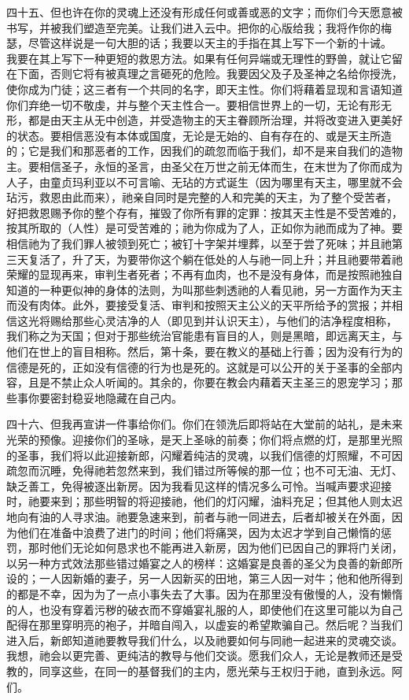 四十五、但也许在你的灵魂上还没有形成任何或善或恶的文字；而你们今天愿意被书写，并被我们塑造至完美。让我们进入云中。把你的心版给我；我将作你的梅瑟，尽管这样说是一句大胆的话；我要以天主的手指在其上写下一个新的十诫。 我要在其上写下一种更短的救恩方法。如果有任何异端或无理性的野兽，就让它留在下面，否则它将有被真理之言砸死的危险。我要因父及子及圣神之名给你授洗，使你成为门徒；这三者有一个共同的名字，即天主性。你们将藉着显现和言语知道你们弃绝一切不敬虔，并与整个天主性合一。要相信世界上的一切，无论有形无形，都是由天主从无中创造，并受造物主的天主眷顾所治理，并将改变进入更美好的状态。要相信恶没有本体或国度，无论是无始的、自有存在的、或是天主所造的；它是我们和那恶者的工作，因我们的疏忽而临于我们，却不是来自我们的造物主。要相信圣子，永恒的圣言，由圣父在万世之前无体而生，在末世为了你而成为人子，由童贞玛利亚以不可言喻、无玷的方式诞生（因为哪里有天主，哪里就不会玷污，救恩由此而来），祂亲自同时是完整的人和完美的天主，为了整个受苦者，好把救恩赐予你的整个存有，摧毁了你所有罪的定罪：按其天主性是不受苦难的，按其所取的（人性）是可受苦难的；祂为你成为了人，正如你为祂而成为了神。要相信祂为了我们罪人被领到死亡；被钉十字架并埋葬，以至于尝了死味；并且祂第三天复活了，升了天，为要带你这个躺在低处的人与祂一同上升；并且祂要带着祂荣耀的显现再来，审判生者死者；不再有血肉，也不是没有身体，而是按照祂独自知道的一种更似神的身体的法则，为叫那些刺透祂的人看见祂，另一方面作为天主而没有肉体。此外，要接受复活、审判和按照天主公义的天平所给予的赏报；并相信这光将赐给那些心灵洁净的人（即见到并认识天主），与他们的洁净程度相称，我们称之为天国；但对于那些统治官能患有盲目的人，则是黑暗，即远离天主，与他们在世上的盲目相称。然后，第十条，要在教义的基础上行善；因为没有行为的信德是死的，正如没有信德的行为也是死的。这就是可以公开的关于圣事的全部内容，且是不禁止众人听闻的。其余的，你要在教会内藉着天主圣三的恩宠学习；那些事你要密封稳妥地隐藏在自己内。\par

四十六、但我再宣讲一件事给你们。你们在领洗后即将站在大堂前的站礼，是未来光荣的预像。迎接你们的圣咏，是天上圣咏的前奏；你们将点燃的灯，是那里光照的圣事，我们将以此迎接新郎，闪耀着纯洁的灵魂，以我们信德的灯照耀，不可因疏忽而沉睡，免得祂若忽然来到，我们错过所等候的那一位；也不可无油、无灯、缺乏善工，免得被逐出新房。因为我看见这样的情况多么可怜。当喊声要求迎接时，祂要来到；那些明智的将迎接祂，他们的灯闪耀，油料充足；但其他人则太迟地向有油的人寻求油。祂要急速来到，前者与祂一同进去，后者却被关在外面，因为他们在准备中浪费了进门的时间；他们将痛哭，因为太迟才学到自己懒惰的惩罚，那时他们无论如何恳求也不能再进入新房，因为他们已因自己的罪将门关闭，以另一种方式效法那些错过婚宴之人的榜样：这婚宴是良善的圣父为良善的新郎所设的；一人因新婚的妻子，另一人因新买的田地，第三人因一对牛；他和他所得到的都是不幸，因为为了一点小事失去了大事。因为在那里没有傲慢的人，没有懒惰的人，也没有穿着污秽的破衣而不穿婚宴礼服的人，即使他们在这里可能以为自己配得在那里穿明亮的袍子，并暗自闯入，以虚妄的希望欺骗自己。然后呢？当我们进入后，新郎知道祂要教导我们什么，以及祂要如何与同祂一起进来的灵魂交谈。我想，祂会以更完善、更纯洁的教导与他们交谈。愿我们众人，无论是教师还是受教的，同享这些，在同一的基督我们的主内，愿光荣与王权归于祂，直到永远。阿们。\par

